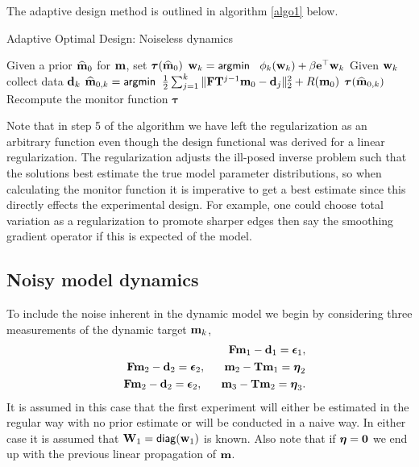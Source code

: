 \documentclass[11pt]{article}
\newcommand{\bfF}	{{\bf{F}}}
\newcommand{\bfI}	{{\bf{I}}}
\newcommand{\bfT}	{{\bf{T}}}
\newcommand{\bfW}	{{\bf{W}}}
\newcommand{\bfd}	{{\bf{d}}}
\newcommand{\bfe}	{{\bf{e}}}
\newcommand{\bfm}	{{\bf{m}}}
\newcommand{\bfw}	{{\bf{w}}}
\newcommand{\hf}        {{\frac 12}}
\newcommand{\bfepsilon} {{\boldsymbol \epsilon}}
\newcommand{\bfeta}     {{\boldsymbol \eta}}
\newcommand{\bftau}      {{\boldsymbol \tau}}
\newcommand {\zero}  { {\bf 0} }
\renewcommand{\hf}		 {\frac12}
\newcommand{\bfmhat}    {{\widehat{\bfm}}}
\begin{document}
\bigskip
The adaptive design method is outlined in  algorithm \ref{algo1} below.
\begin{algorithm}
\caption{Adaptive Optimal Design: Noiseless dynamics}\label{algo1}
\begin{algorithmic}[1]
\State Given a prior $\bfmhat_{0}$  for $\bfm$, set $\bftau(\bfmhat_0)$
\Comment{if there is no prior, $\bftau = \bfI$}
\State $\bfw_{k} = {\sf argmin }\;\;\ \phi_k(\bfw_k) + \beta\bfe^{\top}\bfw_k$  
\State Given $\bfw_k$ collect data $\bfd_k$
%
\State $\bfmhat_{0,k} ={\sf argmin } \;\; \hf  \sum_{j=1}^{k}\| \bfF\bfT^{j-1}\bfm_0 - \bfd_j \|^2_2 + R(\bfm_0)$
\Comment {re-estimate $\bfm_0$ }
\State $\bftau(\bfmhat_{0,k})$
\Comment Recompute the monitor function $\bftau$
\EndFor
\end{algorithmic}
\end{algorithm}
Note that in step 5 of the algorithm we have left the regularization as an arbitrary function even though the design functional was derived for a linear regularization. The regularization adjusts the ill-posed inverse problem such that the solutions best estimate the true model parameter distributions, so when calculating the monitor function it is imperative to get a best estimate since this directly effects the experimental design. For example, one could choose total variation as a regularization to promote sharper edges then say the smoothing gradient operator if this is expected of the model. 
\subsection{Noisy model dynamics}
\label{Kalman}
To include the noise inherent in the dynamic model we begin by  considering three measurements of the dynamic target $\bfm_k$,
\begin{eqnarray*}
\label{eq:noisy}
&&\bfF\bfm_{1} - \bfd_1 = \bfepsilon_1,\\
&&\bfF\bfm_{2} - \bfd_2 = \bfepsilon_2, \;\;\;\;\;\; \bfm_2 -\bfT\bfm_1 = \bfeta_2 \\
&&\bfF\bfm_{2} - \bfd_2 = \bfepsilon_2, \;\;\;\;\;\; \bfm_3 -\bfT\bfm_2 = \bfeta_3.
\end{eqnarray*} 
It is assumed in this case that the first experiment will either be estimated in the regular way with no prior estimate or will be conducted in a naive way. In either case it is assumed that $\bfW_1 = {\sf diag}(\bfw_1)$ is known. Also note that if $\bfeta = \zero$ we end up with the previous linear propagation of $\bfm$. 
\end{document}

